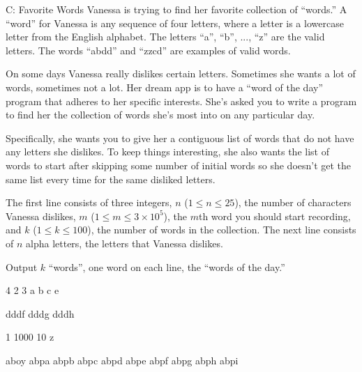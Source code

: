 \begin{problem}{C: Favorite Words}
Vanessa is trying to find her favorite collection of ``words.''
A ``word'' for Vanessa is any sequence of four letters, where a letter is a lowercase letter from the English alphabet.
The letters ``a'', ``b'', ..., ``z'' are the valid letters.
The words ``abdd'' and ``zzcd'' are examples of valid words.

On some days Vanessa really dislikes certain letters.
Sometimes she wants a lot of words, sometimes not a lot.
Her dream app is to have a ``word of the day'' program that adheres to her specific interests.
She's asked you to write a program to find her the collection of words she's most into on any particular day.

Specifically, she wants you to give her a contiguous list of words that do not have any letters she dislikes.
To keep things interesting, she also wants the list of words to start after skipping some number of initial words so she doesn't get the same list every time for the same disliked letters.
\end{problem}

\begin{formalin}
The first line consists of three integers, $n$ ($1 \leq n \leq 25$), the number of characters Vanessa dislikes, $m$ ($1 \leq m \leq 3 \times 10^5$), the $m$th word you should start recording, and $k$ ($1 \leq k \leq 100$), the number of words in the collection.
The next line consists of $n$ alpha letters, the letters that Vanessa dislikes.
\end{formalin}

\begin{formalout}
Output $k$ ``words'', one word on each line, the ``words of the day.''
\end{formalout}

\begin{datain}
4 2 3
a b c e
\end{datain}
\begin{dataout}
dddf
dddg
dddh
\end{dataout}

\begin{datain}
1 1000 10
z
\end{datain}
\begin{dataout}
aboy
abpa
abpb
abpc
abpd
abpe
abpf
abpg
abph
abpi
\end{dataout}
